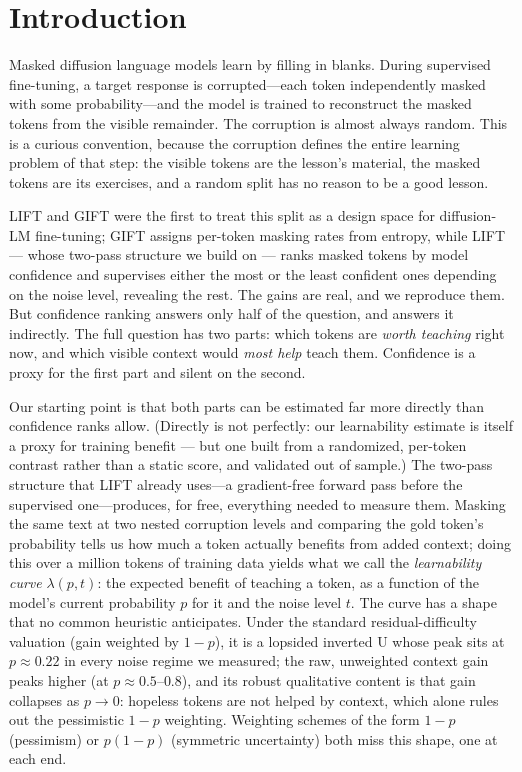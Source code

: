 \documentclass{article} %
\begin{document}
\begin{abstract}
\end{abstract}

\section{Introduction}

Masked diffusion language models learn by filling in blanks. During supervised fine-tuning, a target response is corrupted---each token independently masked with some probability---and the model is trained to reconstruct the masked tokens from the visible remainder. The corruption is almost always random. This is a curious convention, because the corruption defines the entire learning problem of that step: the visible tokens are the lesson's material, the masked tokens are its exercises, and a random split has no reason to be a good lesson.

LIFT \citep{lift2026} and GIFT \citep{gift2025} were the first to treat this split as a design space for diffusion-LM fine-tuning; GIFT assigns per-token masking rates from entropy, while LIFT --- whose two-pass structure we build on --- ranks masked tokens by model confidence and supervises either the most or the least confident ones depending on the noise level, revealing the rest. The gains are real, and we reproduce them. But confidence ranking answers only half of the question, and answers it indirectly. The full question has two parts: which tokens are \emph{worth teaching} right now, and which visible context would \emph{most help} teach them. Confidence is a proxy for the first part and silent on the second.

Our starting point is that both parts can be estimated far more directly than confidence ranks allow. (Directly is not perfectly: our learnability estimate is itself a proxy for training benefit --- but one built from a randomized, per-token contrast rather than a static score, and validated out of sample.) The two-pass structure that LIFT already uses---a gradient-free forward pass before the supervised one---produces, for free, everything needed to measure them. Masking the same text at two nested corruption levels and comparing the gold token's probability tells us how much a token actually benefits from added context; doing this over a million tokens of training data yields what we call the \emph{learnability curve} $\lambda(p, t)$: the expected benefit of teaching a token, as a function of the model's current probability $p$ for it and the noise level $t$. The curve has a shape that no common heuristic anticipates. Under the standard residual-difficulty valuation (gain weighted by $1-p$), it is a lopsided inverted U whose peak sits at $p \approx 0.22$ in every noise regime we measured; the raw, unweighted context gain peaks higher (at $p \approx 0.5$--$0.8$), and its robust qualitative content is that gain collapses as $p \to 0$: hopeless tokens are not helped by context, which alone rules out the pessimistic $1-p$ weighting. Weighting schemes of the form $1-p$ (pessimism) or $p(1-p)$ (symmetric uncertainty) both miss this shape, one at each end.
\end{document}
